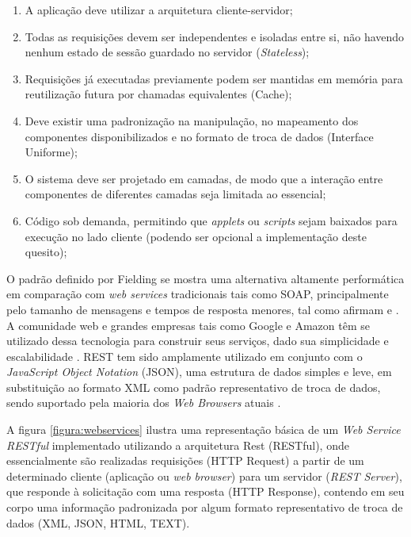 \begin{enumerate}
	\item {A aplicação deve utilizar a arquitetura cliente-servidor;}
	\item {Todas as requisições devem ser independentes e isoladas entre si, não havendo nenhum estado de sessão guardado no servidor (\textit{Stateless});}
	\item {Requisições já executadas previamente podem ser mantidas em memória para reutilização futura por chamadas equivalentes (Cache);}
	\item {Deve existir uma padronização na manipulação, no mapeamento dos componentes disponibilizados e no formato de troca de dados (Interface Uniforme);}
	\item {O sistema deve ser projetado em camadas, de modo que a interação entre componentes de diferentes camadas seja limitada ao essencial;}
	\item {Código sob demanda, permitindo que \textit{applets} ou \textit{scripts} sejam baixados para execução no lado cliente (podendo ser opcional a implementação deste quesito);}
\end{enumerate}

O padrão definido por Fielding se mostra uma alternativa altamente performática em comparação com  \textit{web services} tradicionais tais como SOAP, principalmente pelo tamanho de mensagens e tempos de resposta menores, tal como afirmam  e . A comunidade web e grandes empresas tais como Google e Amazon têm se utilizado dessa tecnologia para construir seus serviços, dado sua simplicidade e escalabilidade \cite{wagh2014hybrid}. REST tem sido amplamente utilizado em conjunto com o \textit{JavaScript Object Notation} (JSON), uma estrutura de dados simples e leve, em substituição ao formato XML como padrão representativo de troca de dados, sendo suportado pela maioria dos \textit{Web Browsers} atuais \cite{knutsen2018}.

A figura \ref{figura:webservices} ilustra uma representação básica de um \textit{Web Service RESTful} implementado utilizando a arquitetura Rest (RESTful), onde essencialmente são realizadas requisições (HTTP Request) a partir de um determinado cliente (aplicação ou \textit{web browser}) para um servidor (\textit{REST Server}), que responde à solicitação com uma resposta (HTTP Response), contendo em seu corpo uma informação padronizada por algum formato representativo de troca de dados (XML, JSON, HTML, TEXT).

